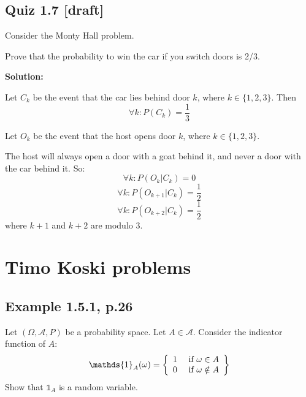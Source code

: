 \documentclass{article}
\begin{document}
\subsection{Quiz 1.7 [draft]}

Consider the Monty Hall problem.

Prove that the probability to win the car if you switch doors is 2/3.

\textbf{Solution:}

Let \(C_k\) be the event that the car lies behind door \(k\), where \(k\in \{1,2,3\}\).
Then
\[\forall k: P(C_k)=\frac13\]

Let \(O_k\) be the event that the host opens door \(k\), where \(k\in \{1,2,3\}\).

The host will always open a door with a goat behind it, and never a door with
the car behind it. So:
\[\forall k: P(O_k|C_k) = 0\]
\[\forall k: P(O_{k+1}|C_k) = \frac12\]
\[\forall k: P(O_{k+2}|C_k) = \frac12\]
where \(k+1\) and \(k+2\) are modulo 3.

\section{Timo Koski problems}
\subsection{Example 1.5.1, p.26}

Let \((\Omega,\mathcal{A},P)\) be a probability space.
Let \(A\in \mathcal{A}\). Consider the indicator function of \(A\):
\[\mathds{1}_A(\omega)=\casesiie{1}{\omega\in A}{0}{\omega\notin A}\]
Show that \(\mathds{1}_A\) is a random variable.
\end{document}
